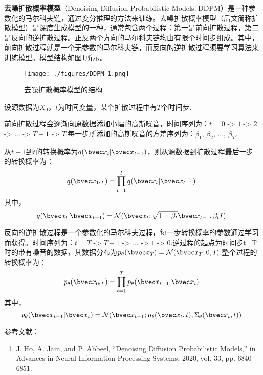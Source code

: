 
\textbf{去噪扩散概率模型}（Denoising Diffusion Probabilistic Models, DDPM）是一种参数化的马尔科夫链，通过变分推理的方法来训练。去噪扩散概率模型（后文简称扩散模型）是深度生成模型的一种，通常包含两个过程：第一是前向扩散过程，第二是反向的逆扩散过程。正反两个方向的马尔科夫链均由有限个时间步组成。其中，前向扩散过程就是一个无参数的马尔科夫链，而反向的逆扩散过程须要学习算法来训练模型。模型结构如图1所示。
\begin{figure}[ht]
\centering
\texttt{[image: ./figures/DDPM\_1.png]}
\caption{去噪扩散概率模型的结构} \label{DDPM_fig1}
\end{figure}

设源数据为$X_0$，$t$为时间变量，某个扩散过程中有$T$个时间步.

前向扩散过程会逐渐向原数据添加小幅的高斯噪音，时间序列为：$t=0$ -> $1$ -> $2$ -> ... -> $T-1$ -> $T$.每一步所添加的高斯噪音的方差序列为：$\beta_1$, $\beta_2$, ..., $\beta_T$.

从$t-1$到$t$的转换概率为$q(\bvec x_t|\bvec x_{t-1})$，则从源数据到扩散过程最后一步的转换概率为：
\begin{equation}
q(\bvec x_{1:T})=\prod_{t=1}^{T}q(\bvec x_{t}|\bvec x_{t-1})
\end{equation}
其中，
\begin{equation}
q(\bvec x_{t}|\bvec x_{t-1})=\mathcal{N}(\bvec x_t;\sqrt{1-\beta_t}\bvec x_{t-1},\beta_tI)
\end{equation}

反向的逆扩散过程是一个参数化的马尔科夫过程，每一步转换概率的参数通过学习而获得。时间序列为：$t=T$ -> $T-1$ -> ... -> $1$ -> $0$.逆过程的起点为时间步t=T时的带有噪音的数据，其数据分布为$p_\theta(\bvec x_T)=\mathcal{N}(\bvec x_T;0,I)$.整个过程的转换概率为：
\begin{equation}
p_{\theta}(\bvec x_{0:T})=\prod_{t=1}^{T}p_{\theta}(\bvec x_{t-1}|\bvec x_{t})
\end{equation}
其中，
\begin{equation}
p_{\theta}(\bvec x_{t-1}|\bvec x_{t})=\mathcal{N}(\bvec x_{t-1};\mu_\theta(\bvec x_{t},t),\Sigma_\theta(\bvec x_t,t))
\end{equation}


参考文献：
\begin{enumerate}
\item J. Ho, A. Jain, and P. Abbeel, “Denoising Diffusion Probabilistic Models,” in Advances in Neural Information Processing Systems, 2020, vol. 33, pp. 6840–6851.
\end{enumerate}